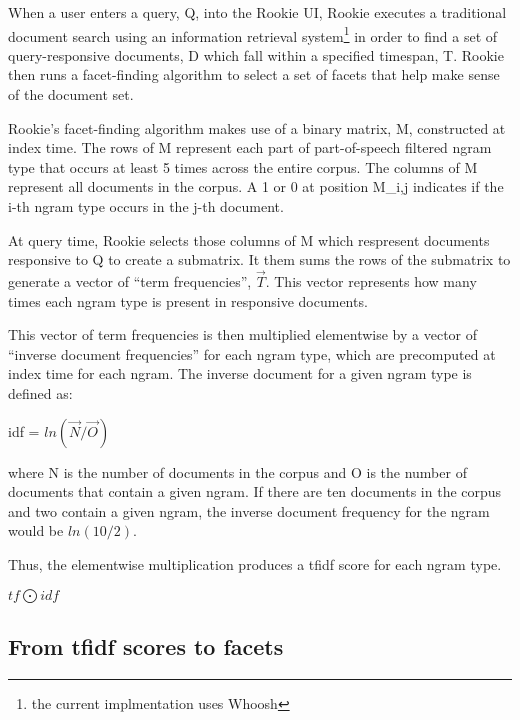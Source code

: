 \usepackage{flexisym}

When a user enters a query, Q, into the Rookie UI, Rookie executes a traditional document search using an information retrieval system\footnote {the current implmentation uses Whoosh} in order to find a set of query-responsive documents, D which fall within a specified timespan, T. Rookie then runs a facet-finding algorithm to select a set of facets that help make sense of the document set. 

Rookie's facet-finding algorithm makes use of a binary matrix, M, constructed at index time. The rows of M represent each part of part-of-speech filtered ngram type that occurs at least 5 times across the entire corpus. The columns of M represent all documents in the corpus. A 1 or 0 at position M_{i,j} indicates if the i-th ngram type occurs in the j-th document.

At query time, Rookie selects those columns of M which respresent documents responsive to Q to create a submatrix. It them sums the rows of the submatrix to generate a vector of ``term frequencies'', $\vec{T}$. This vector represents how many times each ngram type is present in responsive documents. 

This vector of term frequencies is then multiplied elementwise by a vector of ``inverse document frequencies'' for each ngram type, which are precomputed at index time for each ngram. The inverse document for a given ngram type is defined as: 

idf = $ln(\vec{N}/\vec{O})$

where N is the number of documents in the corpus and O is the number of documents that contain a given ngram. If there are ten documents in the corpus and two contain a given ngram, the inverse document frequency for the ngram would be $ln(10/2)$.

Thus, the elementwise multiplication produces a tfidf score for each ngram type.

$ tf \bigodot idf $

\subsection{From tfidf scores to facets}

